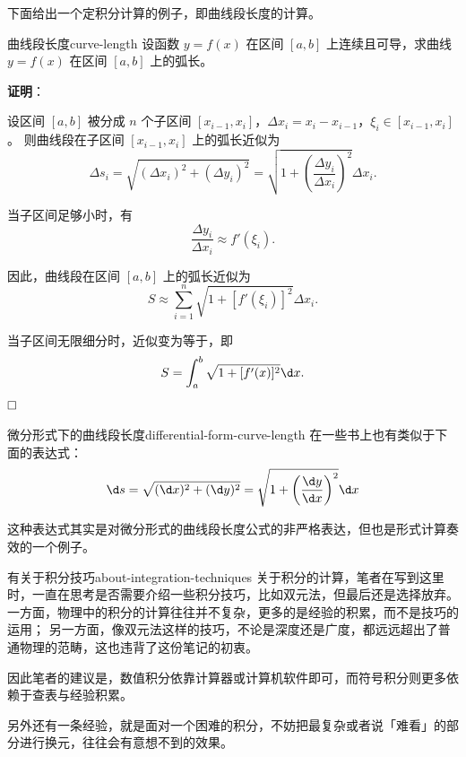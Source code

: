 下面给出一个定积分计算的例子，即曲线段长度的计算。
\begin{example}{曲线段长度}{curve-length}
    设函数 $ y = f(x) $ 在区间 $ [a, b] $ 上连续且可导，求曲线 $ y = f(x) $ 在区间 $ [a, b] $ 上的弧长。

    \textbf{证明}：

    设区间 $ [a, b] $ 被分成 $ n $ 个子区间 $ [x_{i-1}, x_i] $，$ \Delta x_i = x_i - x_{i-1} $，$ \xi_i \in [x_{i-1}, x_i] $。
    则曲线段在子区间 $ [x_{i-1}, x_i] $ 上的弧长近似为
    \begin{equation*}
        \Delta s_i = \sqrt{(\Delta x_i)^2 + (\Delta y_i)^2} = \sqrt{1 + \left( \frac{\Delta y_i}{\Delta x_i} \right)^2} \Delta x_i.
    \end{equation*}

    当子区间足够小时，有
    \begin{equation*}
        \frac{\Delta y_i}{\Delta x_i} \approx f'(\xi_i).
    \end{equation*}

    因此，曲线段在区间 $ [a, b] $ 上的弧长近似为
    \begin{equation*}
        S \approx \sum_{i=1}^n \sqrt{1 + [f'(\xi_i)]^2} \Delta x_i.
    \end{equation*}

    当子区间无限细分时，近似变为等于，即
    \begin{equation*}
        S = \int_a^b \sqrt{1 + [f'(x)]^2} \d x.
    \end{equation*}
    $\hfill\square$
\end{example}

\begin{note}{微分形式下的曲线段长度}{differential-form-curve-length}
    在一些书上也有类似于下面的表达式：
    \begin{equation*}
        \d s = \sqrt {(\d x)^2 + (\d y)^2} = \sqrt {1 + \left( \frac{\d y}{\d x} \right)^2} \d x
    \end{equation*}

    这种表达式其实是对微分形式的曲线段长度公式的非严格表达，但也是形式计算奏效的一个例子。
\end{note}

\begin{note}{有关于积分技巧}{about-integration-techniques}
    关于积分的计算，笔者在写到这里时，一直在思考是否需要介绍一些积分技巧，比如双元法，但最后还是选择放弃。
    一方面，物理中的积分的计算往往并不复杂，更多的是经验的积累，而不是技巧的运用；
    另一方面，像双元法这样的技巧，不论是深度还是广度，都远远超出了普通物理的范畴，这也违背了这份笔记的初衷。

    因此笔者的建议是，数值积分依靠计算器或计算机软件即可，而符号积分则更多依赖于查表与经验积累。

    另外还有一条经验，就是面对一个困难的积分，不妨把最复杂或者说「难看」的部分进行换元，往往会有意想不到的效果。
\end{note}


